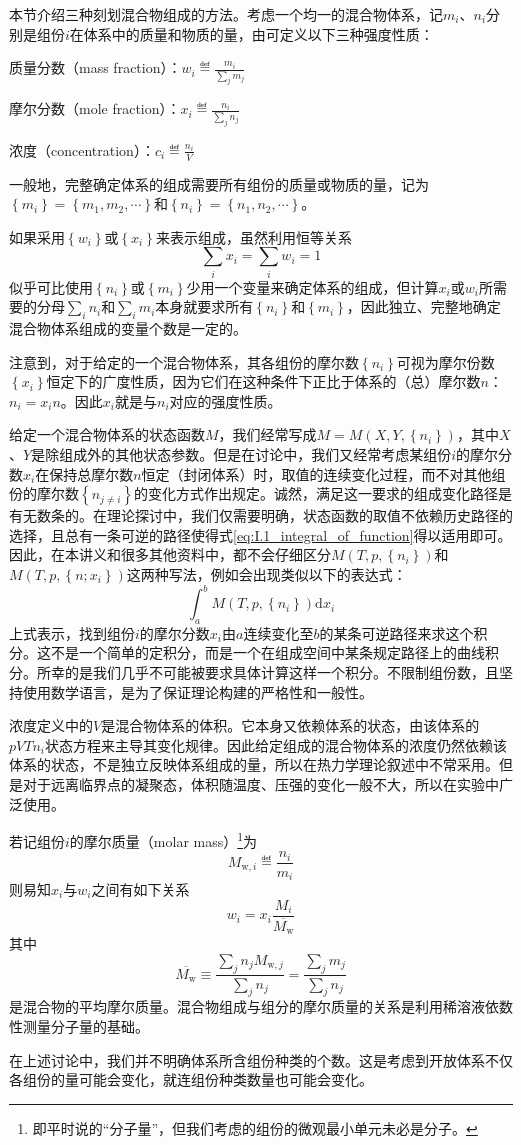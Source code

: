 \documentclass[main.tex]{subfiles}
\begin{document}
本节介绍三种刻划混合物组成的方法。考虑一个均一的混合物体系，记$m_i$、$n_i$分别是组份$i$在体系中的质量和物质的量，由可定义以下三种强度性质：

质量分数（mass fraction）：$w_i\eqdef\frac{m_i}{\sum_jm_j}$

摩尔分数（mole fraction）：$x_i\eqdef\frac{n_i}{\sum_jn_j}$

浓度（concentration）：$c_i\eqdef\frac{n_i}{V}$

一般地，完整确定体系的组成需要所有组份的质量或物质的量，记为$\left\{m_i\right\}=\left\{m_1,m_2,\cdots\right\}$和$\left\{n_i\right\}=\left\{n_1,n_2,\cdots\right\}$。

如果采用$\left\{w_i\right\}$或$\left\{x_i\right\}$来表示组成，虽然利用恒等关系
\[\sum_ix_i=\sum_iw_i=1\]
似乎可比使用$\left\{n_i\right\}$或$\left\{m_i\right\}$少用一个变量来确定体系的组成，但计算$x_i$或$w_i$所需要的分母$\sum_in_i$和$\sum_im_i$本身就要求所有$\left\{n_i\right\}$和$\left\{m_i\right\}$，因此独立、完整地确定混合物体系组成的变量个数是一定的。

注意到，对于给定的一个混合物体系，其各组份的摩尔数$\left\{n_i\right\}$可视为摩尔份数$\left\{x_i\right\}$恒定下的广度性质，因为它们在这种条件下正比于体系的（总）摩尔数$n$：$n_i=x_in$。因此$x_i$就是与$n_i$对应的强度性质。

给定一个混合物体系的状态函数$M$，我们经常写成$M=M\left(X,Y,\left\{n_i\right\}\right)$，其中$X$、$Y$是除组成外的其他状态参数。但是在讨论中，我们又经常考虑某组份$i$的摩尔分数$x_i$在保持总摩尔数$n$恒定（封闭体系）时，取值的连续变化过程，而不对其他组份的摩尔数$\left\{n_{j\neq i}\right\}$的变化方式作出规定。诚然，满足这一要求的组成变化路径是有无数条的。在理论探讨中，我们仅需要明确，状态函数的取值不依赖历史路径的选择，且总有一条可逆的路径使得式\eqref{eq:I.1_integral_of_function}得以适用即可。因此，在本讲义和很多其他资料中，都不会仔细区分$M\left(T,p,\left\{n_i\right\}\right)$和$M\left(T,p,\left\{n;x_i\right\}\right)$这两种写法，例如会出现类似以下的表达式：
\[\int_a^bM\left(T,p,\left\{n_i\right\}\right)\mathrm{d}x_i\]
上式表示，找到组份$i$的摩尔分数$x_i$由$a$连续变化至$b$的某条可逆路径来求这个积分。这不是一个简单的定积分，而是一个在组成空间中某条规定路径上的曲线积分。所幸的是我们几乎不可能被要求具体计算这样一个积分。不限制组份数，且坚持使用数学语言，是为了保证理论构建的严格性和一般性。

浓度定义中的$V$是混合物体系的体积。它本身又依赖体系的状态，由该体系的$pVTn_i$状态方程来主导其变化规律。因此给定组成的混合物体系的浓度仍然依赖该体系的状态，不是独立反映体系组成的量，所以在热力学理论叙述中不常采用。但是对于远离临界点的凝聚态，体积随温度、压强的变化一般不大，所以在实验中广泛使用。

若记组份$i$的摩尔质量（molar mass）\footnote{即平时说的“分子量”，但我们考虑的组份的微观最小单元未必是分子。}为
\[M_{\text{w},i}\eqdef\frac{n_i}{m_i}\]
则易知$x_i$与$w_i$之间有如下关系
\[w_i=x_i\frac{M_i}{\overline{M_\text{w}}}\]
其中
\[\overline{M_\text{w}}\equiv\frac{\sum_jn_jM_{\text{w},j}}{\sum_jn_j}=\frac{\sum_jm_j}{\sum_jn_j}\]
是混合物的平均摩尔质量。混合物组成与组分的摩尔质量的关系是利用稀溶液依数性测量分子量的基础。

在上述讨论中，我们并不明确体系所含组份种类的个数。这是考虑到开放体系不仅各组份的量可能会变化，就连组份种类数量也可能会变化。
\end{document}
